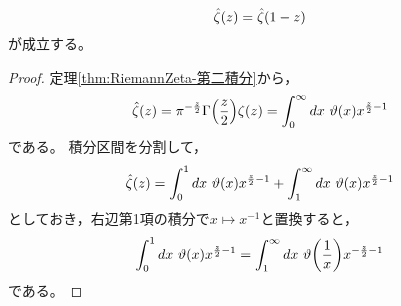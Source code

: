 \documentclass[a4paper,draft]{ltjsarticle}
\begin{document}
\begin{thm}
    \begin{equation}
        \fun{\hat{\zeta}}{z}=\fun{\hat{\zeta}}{1-z}
        \label{eq:RiemannZeta-完備RiemannZetaの関数等式}
    \end{equation}
    が成立する。
    \begin{proof}
        定理\ref{thm:RiemannZeta-第二積分}から，
        \begin{equation}
            \fun{\hat{\zeta}}{z}=\pi^{-\frac{z}{2}}\fun{\Gamma}{\frac{z}{2}}\fun{\zeta}{z}=\int_0^\infty dx\ \fun{\vartheta}{x}x^{\frac{z}{2}-1}
        \end{equation}
        である。
        積分区間を分割して，
        \begin{equation}
            \fun{\hat{\zeta}}{z}=\int_0^1 dx\ \fun{\vartheta}{x}x^{\frac{z}{2}-1}+\int_1^\infty dx\ \fun{\vartheta}{x}x^{\frac{z}{2}-1}
        \end{equation}
        としておき，右辺第1項の積分で$x\mapsto x^{-1}$と置換すると，
        \begin{equation}
            \int_0^1 dx\ \fun{\vartheta}{x}x^{\frac{z}{2}-1}=\int_1^\infty dx\ \fun{\vartheta}{\frac{1}{x}}x^{-\frac{z}{2}-1}
        \end{equation}
        である。
        

\end{proof}
\end{thm}
\end{document}
